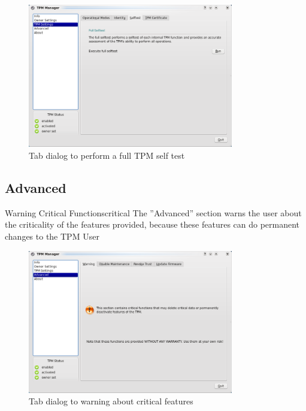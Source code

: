 \documentclass[
  american        %
]{sirrixreport}
\begin{document}
\begin{figure}[h]
 \centering
 \includegraphics[width=0.8\textwidth]{images/tpm_selftest}
 \caption{Tab dialog to perform a full TPM self test }
\end{figure}
\clearpage


\subsection{Advanced}

\begin{usecase}{Warning Critical Functions}{critical}
\ucdesc The ”Advanced” section warns the user about the criticality of the features provided, because these features can do permanent changes to the TPM 
\ucactors User
\end{usecase}

\begin{figure}[h]
 \centering
 \includegraphics[width=0.8\textwidth]{images/tpm_advanced_warning}
 \caption{Tab dialog to warning about critical features }
\end{figure}
\clearpage
\end{document}
